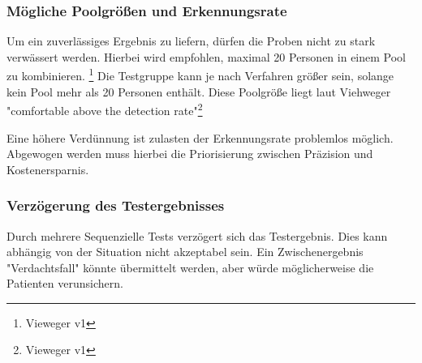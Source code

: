 \subsubsection{Mögliche Poolgrößen und Erkennungsrate}
Um ein zuverlässiges Ergebnis zu liefern, dürfen die Proben nicht zu stark verwässert werden.
Hierbei wird empfohlen, maximal 20 Personen in einem Pool zu kombinieren. \footnote{Vieweger v1}
Die Testgruppe kann je nach Verfahren größer sein, solange kein Pool mehr als 20 Personen enthält.
Diese Poolgröße liegt laut Viehweger "comfortable above the detection rate"\footnote{Vieweger v1}

Eine höhere Verdünnung ist zulasten der Erkennungsrate problemlos möglich.
Abgewogen werden muss hierbei die Priorisierung zwischen Präzision und Kostenersparnis.

\subsubsection{Verzögerung des Testergebnisses}
Durch mehrere Sequenzielle Tests verzögert sich das Testergebnis.
Dies kann abhängig von der Situation nicht akzeptabel sein.
Ein Zwischenergebnis "Verdachtsfall" könnte übermittelt werden, aber würde möglicherweise die Patienten verunsichern.


